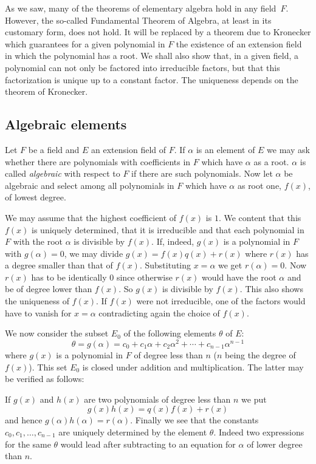 \documentclass[10pt,leqno]{article}
\theoremstyle{definition}
\begin{document}
As we saw, many of the theorems of elementary algebra hold in any field~$F$.
However, the so-called Fundamental Theorem of Algebra, at least in its customary form, does not hold.
It will be replaced by a theorem due to Kronecker which guarantees for a given polynomial in $F$ the existence of an extension field in which the polynomial has a root.
We shall also show that, in a given field, a polynomial can not only be factored into irreducible factors, but that this factorization is unique up to a constant factor.
The uniqueness depends on the theorem of Kronecker.


\subsection{Algebraic elements}

Let $F$ be a field and $E$ an extension field of $F$.
If $\alpha$ is an element of $E$ we may ask whether there are polynomials with coefficients in $F$ which have $\alpha$ as a root.
$\alpha$ is called \emph{algebraic} with respect to $F$ if there are such polynomials.
Now let $\alpha$ be algebraic and select among all polynomials in $F$ which have $\alpha$ as root one, $f(x)$, of lowest degree.

We may assume that the highest coefficient of $f(x)$ is $1$.
We content that this $f(x)$ is uniquely determined, that it is irreducible and that each polynomial in $F$ with the root $\alpha$ is divisible by $f(x)$.
If, indeed, $g(x)$ is a polynomial in $F$ with $g(\alpha) = 0$, we may divide $g(x) = f(x) q(x) + r(x)$ where $r(x)$ has a degree smaller than that of $f(x)$.
\label{p25}%
Substituting $x = \alpha$ we get $r(\alpha) = 0$.
Now $r(x)$ has to be identically $0$ since otherwise $r(x)$ would have the root $\alpha$ and be of degree lower than $f(x)$.
So $g(x)$ is divisible by $f(x)$.
This also shows the uniqueness of $f(x)$.
If $f(x)$ were not irreducible, one of the factors would have to vanish for $x = \alpha$ contradicting again the choice of $f(x)$.

We now consider the subset $E_0$ of the following elements $\theta$ of $E$:
\[
\theta = g(\alpha) = c_0 + c_1\alpha + c_2\alpha^2 + \cdots + c_{n-1} \alpha^{n-1}
\]
where $g(x)$ is a polynomial in $F$ of degree less than $n$ ($n$ being the degree of $f(x)$).
This set $E_0$ is closed under addition and multiplication.
The latter may be verified as follows:

If $g(x)$ and $h(x)$ are two polynomials of degree less than $n$ we put 
\[
g(x) h(x) = q(x) f(x) + r(x)
\]
and hence $g(\alpha) h(\alpha) = r(\alpha)$.
Finally we see that the constants $c_0, c_1, \ldots, c_{n-1}$ are uniquely determined by the element $\theta$.
Indeed two expressions for the same $\theta$ would lead after subtracting to an equation for $\alpha$ of lower degree than $n$.
\end{document}
